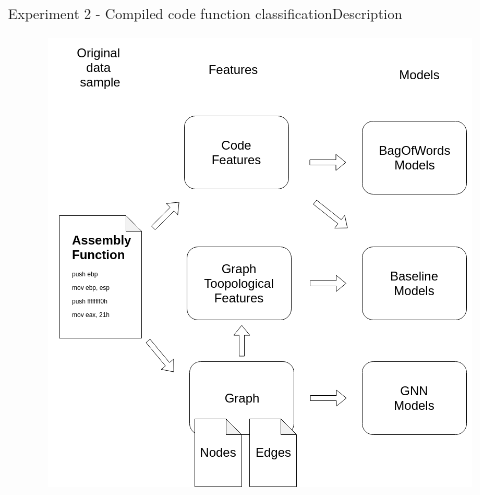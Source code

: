 \documentclass[xcolor=table]{beamer}
\begin{document}
\begin{frame}{Experiment 2 - Compiled code function classification}{Description}



\begin{figure}
    \includegraphics[scale=0.24]{./img/Features_and_models_diagram.png}
\end{figure} 








\end{frame}
\end{document}
